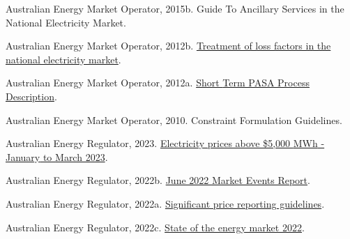 \documentclass[12pt,a4paper,]{report}
\newlength{\cslhangindent}
\newenvironment{CSLReferences}[2] %
 {%
  \setlength{\parindent}{0pt}
  \ifodd #1 \everypar{\setlength{\hangindent}{\cslhangindent}}\ignorespaces\fi
  \ifnum #2 > 0
  \setlength{\parskip}{#2\baselineskip}
  \fi
 }%
 {}
\begin{document}
\begin{CSLReferences}{1}{0}
\leavevmode{}%
Australian Energy Market Operator, 2015b. Guide {To Ancillary Services}
in the {National Electricity Market}.

\leavevmode{}%
Australian Energy Market Operator, 2012b.
\href{https://www.aemo.com.au/Electricity/National-Electricity-Market-NEM/Security-and-reliability/-/media/93BB87A6E1F141DBB7B0D02AFD902D4F.ashx}{Treatment
of loss factors in the national electricity market}.

\leavevmode{}%
Australian Energy Market Operator, 2012a.
\href{https://www.aemo.com.au/-/media/files/electricity/nem/planning_and_forecasting/pasa/stpasa-process-description.pdf}{Short
{Term PASA Process Description}}.

\leavevmode{}%
Australian Energy Market Operator, 2010. Constraint {Formulation
Guidelines}.

\leavevmode{}%
Australian Energy Regulator, 2023.
\href{https://www.aer.gov.au/system/files/AER\%20-\%20Electricity\%20prices\%20above\%20\%245\%2C000\%20MWh\%20-\%20January\%20to\%20March\%202023_1.pdf}{Electricity
prices above \$5,000 {MWh} - {January} to {March} 2023}.

\leavevmode{}%
Australian Energy Regulator, 2022b.
\href{https://www.aer.gov.au/system/files/AER\%20June\%202022\%20Market\%20Events\%20Report-\%20FINAL\%20VERSION\%20-\%2014\%20December\%202022.pdf}{June
2022 {Market Events Report}}.

\leavevmode{}%
Australian Energy Regulator, 2022a.
\href{https://www.aer.gov.au/system/files/AER\%20-\%20Significant\%20Price\%20Reporting\%20Guidelines\%20-\%20September\%202022_0.pdf}{Significant
price reporting guidelines}.

\leavevmode{}%
Australian Energy Regulator, 2022c.
\href{https://www.aer.gov.au/system/files/State\%20of\%20the\%20energy\%20market\%202022\%20-\%20Full\%20report.pdf}{State
of the energy market 2022}.


\end{CSLReferences}
\end{document}
